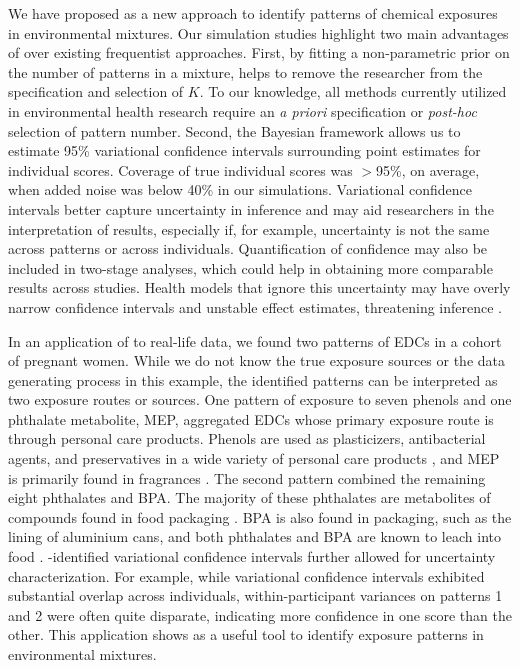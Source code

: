 We have proposed \bnmf as a new approach to identify patterns of chemical exposures in environmental mixtures. Our simulation studies highlight two main advantages of \bnmf over existing frequentist approaches. First, by fitting a non-parametric prior on the number of patterns in a mixture, \bnmf helps to remove the researcher from the specification and selection of $K$. To our knowledge, all methods currently utilized in environmental health research require an \textit{a priori} specification or \textit{post-hoc} selection of pattern number. Second, the Bayesian framework allows us to estimate 95\% variational confidence intervals surrounding point estimates for individual scores. Coverage of true individual scores was $>$95\%, on average, when added noise was below 40\% in our simulations. Variational confidence intervals better capture uncertainty in inference and may aid researchers in the interpretation of results, especially if, for example, uncertainty is not the same across patterns or across individuals. Quantification of confidence may also be included in two-stage analyses, which could help in obtaining more comparable results across studies. Health models that ignore this uncertainty may have overly narrow confidence intervals and unstable effect estimates, threatening inference \citep{mak14_unc}.

In an application of \bnmf to real-life data, we found two patterns of EDCs in a cohort of pregnant women. While we do not know the true exposure sources or the data generating process in this example, the identified patterns can be interpreted as two exposure routes or sources. One pattern of exposure to seven phenols and one phthalate metabolite, MEP, aggregated EDCs whose primary exposure route is through personal care products. Phenols are used as plasticizers, antibacterial agents, and preservatives in a wide variety of personal care products \citep{philippat2015exposure}, and MEP is primarily found in fragrances \citep{koniecki2011phthalates}. The second pattern combined the remaining eight phthalates and BPA. The majority of these phthalates are metabolites of compounds found in food packaging \citep{schettler2006human}. BPA is also found in packaging, such as the lining of aluminium cans, and both phthalates and BPA are known to leach into food \citep{vandenberg2007human}. \bnmfc-identified variational confidence intervals further allowed for uncertainty characterization. For example, while variational confidence intervals exhibited substantial overlap across individuals, within-participant variances on patterns 1 and 2 were often quite disparate, indicating more confidence in one score than the other. This application shows \bnmf as a useful tool to identify exposure patterns in environmental mixtures. 

